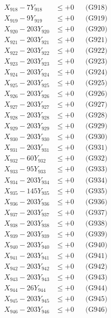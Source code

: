 \documentclass[a4paper,10pt]{article}
\begin{document}
{\begin{align}
X_{918} - 7Y_{918} &\leq +0 && \text{(G918)} \\
X_{919} - 9Y_{919} &\leq +0 && \text{(G919)} \\
X_{920} - 203Y_{920} &\leq +0 && \text{(G920)} \\
\allowbreak
X_{921} - 203Y_{921} &\leq +0 && \text{(G921)} \\
X_{922} - 203Y_{922} &\leq +0 && \text{(G922)} \\
X_{923} - 203Y_{923} &\leq +0 && \text{(G923)} \\
X_{924} - 203Y_{924} &\leq +0 && \text{(G924)} \\
X_{925} - 203Y_{925} &\leq +0 && \text{(G925)} \\
X_{926} - 203Y_{926} &\leq +0 && \text{(G926)} \\
X_{927} - 203Y_{927} &\leq +0 && \text{(G927)} \\
X_{928} - 203Y_{928} &\leq +0 && \text{(G928)} \\
X_{929} - 203Y_{929} &\leq +0 && \text{(G929)} \\
X_{930} - 203Y_{930} &\leq +0 && \text{(G930)} \\
\allowbreak
X_{931} - 203Y_{931} &\leq +0 && \text{(G931)} \\
X_{932} - 60Y_{932} &\leq +0 && \text{(G932)} \\
X_{933} - 95Y_{933} &\leq +0 && \text{(G933)} \\
X_{934} - 203Y_{934} &\leq +0 && \text{(G934)} \\
X_{935} - 145Y_{935} &\leq +0 && \text{(G935)} \\
X_{936} - 203Y_{936} &\leq +0 && \text{(G936)} \\
X_{937} - 203Y_{937} &\leq +0 && \text{(G937)} \\
X_{938} - 203Y_{938} &\leq +0 && \text{(G938)} \\
X_{939} - 203Y_{939} &\leq +0 && \text{(G939)} \\
X_{940} - 203Y_{940} &\leq +0 && \text{(G940)} \\
\allowbreak
X_{941} - 203Y_{941} &\leq +0 && \text{(G941)} \\
X_{942} - 203Y_{942} &\leq +0 && \text{(G942)} \\
X_{943} - 203Y_{943} &\leq +0 && \text{(G943)} \\
X_{944} - 26Y_{944} &\leq +0 && \text{(G944)} \\
X_{945} - 203Y_{945} &\leq +0 && \text{(G945)} \\
X_{946} - 203Y_{946} &\leq +0 && \text{(G946)} \\

\end{align}}
\end{document}
